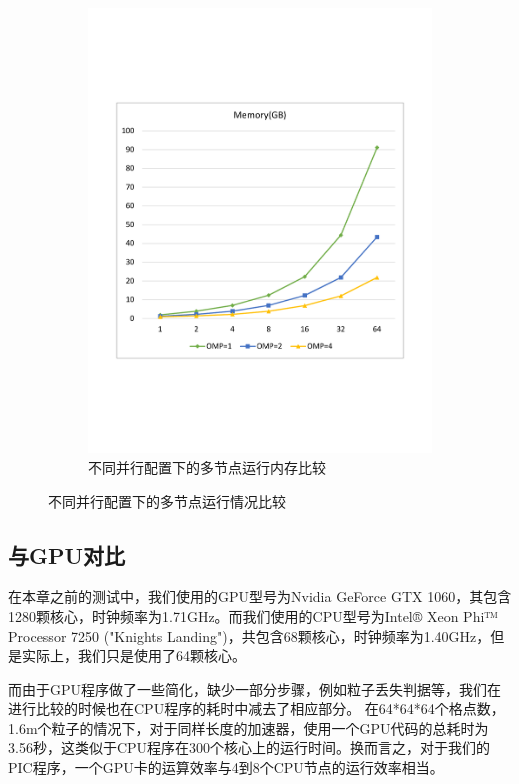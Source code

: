 \begin{figure}[!htb]
\begin{subfigure}[b]{0.48\textwidth}
        \includegraphics[width=\textwidth]{Img/PIC_speedup_Cori_multi_nodes_memory.pdf}
        \caption{不同并行配置下的多节点运行内存比较}
    \end{subfigure}
    \caption{不同并行配置下的多节点运行情况比较}\label{fig:PIC_speedup_Cori_multi_nodes_timeMemory}
\end{figure}

\subsection{与GPU对比}

在本章之前的测试中，我们使用的GPU型号为Nvidia GeForce GTX 1060，其包含1280颗核心，时钟频率为1.71GHz。而我们使用的CPU型号为Intel® Xeon Phi™ Processor 7250 ("Knights Landing")，共包含68颗核心，时钟频率为1.40GHz，但是实际上，我们只是使用了64颗核心。

而由于GPU程序做了一些简化，缺少一部分步骤，例如粒子丢失判据等，我们在进行比较的时候也在CPU程序的耗时中减去了相应部分。
在64*64*64个格点数，1.6m个粒子的情况下，对于同样长度的加速器，使用一个GPU代码的总耗时为3.56秒，这类似于CPU程序在300个核心上的运行时间。换而言之，对于我们的PIC程序，一个GPU卡的运算效率与4到8个CPU节点的运行效率相当。


